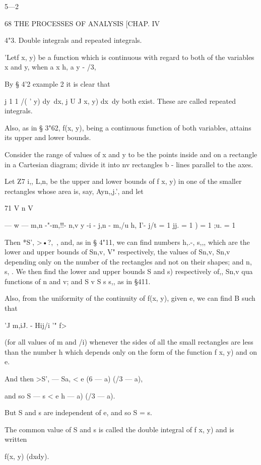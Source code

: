 5—2



68 THE PROCESSES OF ANALYSIS [CHAP. IV

4"3. Double integrals and repeated integrals.

'Letf x, y) be a function which is continuous with regard to both of
the variables x and y, when a x h, a y - /3,

By § 4'2 example 2 it is clear that

j 1 1 /( ' y) dy\ dx, j U J x, y) dx\ dy both exist. These are called
repeated integrals.



Also, as in § 3"62, f(x, y), being a continuous function of both
variables, attains its upper and lower bounds.

Consider the range of values of x and y to be the points inside and on
a rectangle in a Cartesian diagram; divide it into nv rectangles b -
lines parallel to the axes.

Let Z7 i,, L,n, be the upper and lower bounds of f x, y) in one of
the smaller rectangles whose area is, say, Ayn,,j.', and let

71 V n V

— w — m,n -"-m,!!- n,v y -i - j,n - m,/u h, I'- j/t = 1 jj. = 1 ) = 1
;u. = 1

Then *S', >•?, \,, and, as in § 4"11, we can find numbers h,.-, s,,,
which are the lower and upper bounds of Sn,v, V" respectively, the
values of Sn,v, Sn,v depending only on the number of the rectangles
and not on their shapes; and n, s, . We then find the lower and upper
bounds S and s) respectively of,, Sn,v qua functions of n and v;
and S v S s s,, as in §411.

Also, from the uniformity of the continuity of f(x, y), given e, we
can find B such that

'J m,iJ. - Hij/i '" f>

(for all values of m and /i) whenever the sides of all the small
rectangles are less than the number h which depends only on the form
of the function f x, y) and on e.

And then >S', — Sa, < e (6 — a) (/3 — a),

and so S — s < e h — a) (/3 — a).

But S and s are independent of e, and so S = s.

The common value of S and s is called the double integral of f x, y)
and is written

f(x, y) (dxdy).




